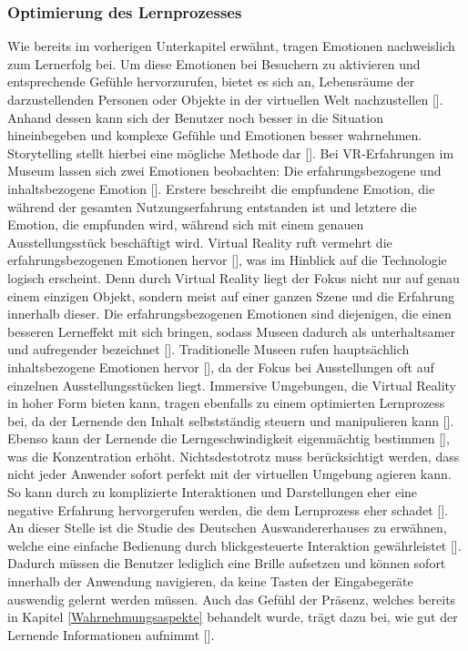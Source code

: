 \documentclass[a4paper,12pt,oneside]{article}
\begin{document}
      \subsubsection{Optimierung des Lernprozesses} \label{Optimierung des Lernprozesses}
        Wie bereits im vorherigen Unterkapitel erwähnt, tragen Emotionen nachweislich zum
        Lernerfolg bei. Um diese Emotionen bei Besuchern zu aktivieren und entsprechende
        Gefühle hervorzurufen, bietet es sich an, Lebensräume der darzustellenden Personen
        oder Objekte in der virtuellen Welt nachzustellen [\cite[35-36]{Heidsiek2019}].
        Anhand dessen kann sich der Benutzer noch besser in die Situation hineinbegeben
        und komplexe Gefühle und Emotionen besser wahrnehmen. Storytelling stellt hierbei
        eine mögliche Methode dar [\cite[35-39]{Heidsiek2019}].
        Bei VR-Erfahrungen im Museum lassen sich zwei Emotionen beobachten: 
        Die erfahrungsbezogene und inhaltsbezogene Emotion [\cite[69]{Heidsiek2019}]. 
        Erstere beschreibt die
        empfundene Emotion, die während der gesamten Nutzungserfahrung entstanden ist und
        letztere die Emotion, die empfunden wird, während sich mit einem genauen
        Ausstellungsstück beschäftigt wird. Virtual Reality ruft vermehrt die 
        erfahrungsbezogenen Emotionen hervor [\cite[69]{Heidsiek2019}], was im Hinblick auf
        die Technologie logisch erscheint. Denn durch Virtual Reality liegt der
        Fokus nicht nur auf genau einem einzigen Objekt, sondern meist auf einer ganzen
        Szene und die Erfahrung innerhalb dieser. Die erfahrungsbezogenen Emotionen 
        sind diejenigen, die einen besseren
        Lerneffekt mit sich bringen, sodass Museen dadurch als unterhaltsamer und
        aufregender bezeichnet [\cite[69]{Heidsiek2019}]. Traditionelle Museen rufen 
        hauptsächlich inhaltsbezogene Emotionen hervor [\cite[69]{Heidsiek2019}], da der
        Fokus bei Ausstellungen oft auf einzelnen Ausstellungsstücken liegt.
        Immersive Umgebungen, die Virtual Reality in hoher Form bieten kann, tragen ebenfalls
        zu einem optimierten Lernprozess bei, da der Lernende den Inhalt selbstständig steuern
        und manipulieren kann [\cite[777]{Katz2015}]. Ebenso kann der Lernende
        die Lerngeschwindigkeit eigenmächtig bestimmen [\cite[777]{Katz2015}],
        was die Konzentration erhöht. Nichtsdestotrotz muss berücksichtigt werden,
        dass nicht jeder Anwender sofort perfekt mit der virtuellen Umgebung agieren
        kann. So kann durch zu komplizierte Interaktionen und Darstellungen
        eher eine negative Erfahrung hervorgerufen werden, die dem Lernprozess eher
        schadet [\cite[777]{Katz2015}]. An dieser Stelle ist die
        Studie des Deutschen Auswandererhauses zu erwähnen, welche eine einfache
        Bedienung durch blickgesteuerte Interaktion gewährleistet [\cite[38]{Heidsiek2019}].
        Dadurch müssen die Benutzer lediglich eine Brille aufsetzen und können
        sofort innerhalb der Anwendung navigieren, da keine Tasten der Eingabegeräte
        auswendig gelernt werden müssen.
        Auch das Gefühl der Präsenz, welches bereits in Kapitel \ref{Wahrnehmungsaspekte}
        behandelt wurde, trägt dazu bei, wie gut der Lernende Informationen aufnimmt
        [\cite[777]{Katz2015}].
\end{document}
